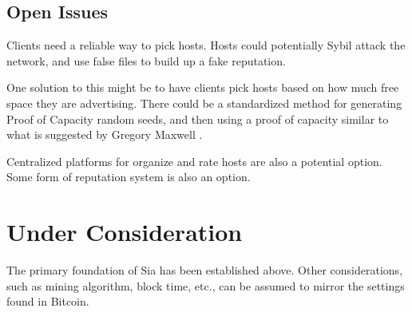 \documentclass[twocolumn]{article}
\begin{document}
\subsection{Open Issues}
Clients need a reliable way to pick hosts.
Hosts could potentially Sybil attack the network, and use false files to build up a fake reputation.

One solution to this might be to have clients pick hosts based on how much free space they are advertising.
There could be a standardized method for generating Proof of Capacity random seeds, and then using a proof of capacity similar to what is suggested by Gregory Maxwell \cite{poc}.

Centralized platforms for organize and rate hosts are also a potential option.
Some form of reputation system is also an option.



\section{Under Consideration}
The primary foundation of Sia has been established above.
Other considerations, such as mining algorithm, block time, etc., can be assumed to mirror the settings found in Bitcoin.
\end{document}
